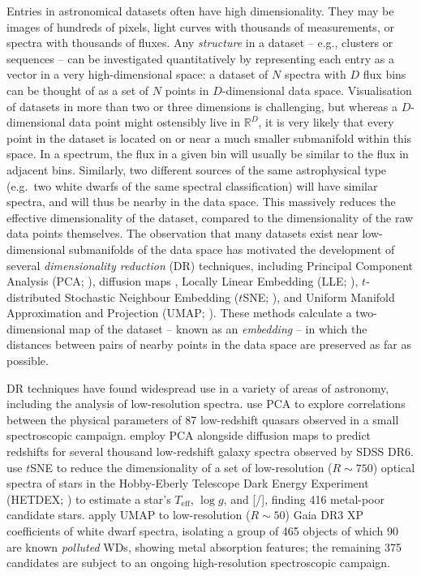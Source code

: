 \documentclass[fleqn,usenatbib]{mnras}
\def\Teff{T_\mathrm{eff}}
\begin{document}
Entries in astronomical datasets often have high dimensionality.
They may be images of hundreds of pixels, light curves with thousands of measurements, or spectra with thousands of fluxes.
Any \textit{structure} in a dataset -- e.g., clusters or sequences -- can be investigated quantitatively by representing each entry as a vector in a very high-dimensional space: a dataset of $N$ spectra with $D$ flux bins can be thought of as a set of $N$ points in $D$-dimensional data space.
Visualisation of datasets in more than two or three dimensions is challenging, but whereas a $D$-dimensional data point might ostensibly live in $\mathbb{R}^D$, it is very likely that every point in the dataset is located on or near a much smaller submanifold within this space.
In a spectrum, the flux in a given bin will usually be similar to the flux in adjacent bins.
Similarly, two different sources of the same astrophysical type (e.g.\ two white dwarfs of the same spectral classification) will have similar spectra, and will thus be nearby in the data space.
This massively reduces the effective dimensionality of the dataset, compared to the dimensionality of the raw data points themselves.
The observation that many datasets exist near low-dimensional submanifolds of the data space has motivated the development of several \textit{dimensionality reduction} (DR) techniques, including Principal Component Analysis (PCA; \citealt{pca}), diffusion maps \citep{coifman06, lafon06}, Locally Linear Embedding (LLE; \citealt{roweis00}), $t$-distributed Stochastic Neighbour Embedding ($t$SNE; \citealt{tsne}), and Uniform Manifold Approximation and Projection (UMAP; \citealt{umap}).
These methods calculate a two-dimensional map of the dataset -- known as an \textit{embedding} -- in which the distances between pairs of nearby points in the data space are preserved as far as possible.

DR techniques have found widespread use in a variety of areas of astronomy, including the analysis of low-resolution spectra.
\citet{boroson92} use PCA to explore correlations between the physical parameters of 87 low-redshift quasars observed in a small spectroscopic campaign.
\citet{richards09} employ PCA alongside diffusion maps to predict redshifts for several thousand low-redshift galaxy spectra observed by SDSS DR6.
\citet{hawkins21} use $t$SNE to reduce the dimensionality of a set of low-resolution ($R\sim750$) optical spectra of stars in the Hobby-Eberly Telescope Dark Energy Experiment (HETDEX; \citealt{gebhardt21}) to estimate a star's $\Teff$, $\log g$, and [/], finding 416 metal-poor candidate stars.
\citet{kao24} apply UMAP to low-resolution ($R\sim50$) Gaia DR3 XP coefficients of white dwarf spectra, isolating a group of 465 objects of which 90 are known \textit{polluted} WDs, showing metal absorption features; the remaining 375 candidates are subject to an ongoing high-resolution spectroscopic campaign.
\end{document}
